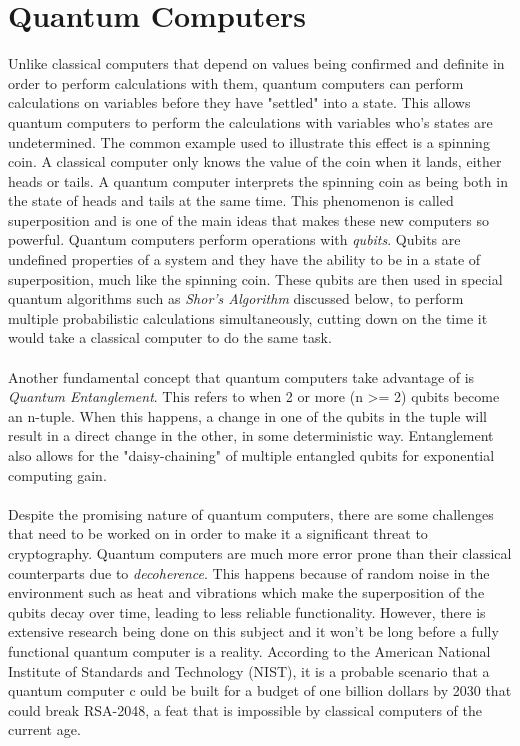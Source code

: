 \documentclass[journal]{IEEEtran}
\begin{document}
\section{Quantum Computers}
Unlike classical computers that depend on values being confirmed and definite in order to perform calculations with them, quantum computers can perform calculations 
on variables before they have "settled" into  a state. This allows quantum computers to perform the calculations with variables who’s states are undetermined. 
The common example used to illustrate this effect is a spinning coin. A classical computer only knows the value of the coin when it lands, either heads or tails. 
A quantum computer interprets the spinning coin as being both in the state of heads and tails at the same time. 
This phenomenon is called superposition and is one of the main ideas that makes these new computers so powerful. Quantum computers perform operations with \emph{qubits}. 
Qubits are undefined properties of a system and they have the ability to be in a state of superposition, much like the spinning coin. These qubits are then used in special quantum algorithms such as 
\emph{Shor's Algorithm} discussed below, to perform multiple probabilistic calculations simultaneously, cutting down on the time it would take a classical computer to do the same task. \\ \\ 
Another fundamental concept that quantum computers take advantage of is \emph{Quantum Entanglement}. This refers to when 2 or more (n >= 2) qubits become an n-tuple. When this happens, 
a change in one of the qubits in the tuple will result in a direct change in the other, in some deterministic way. Entanglement also allows for the "daisy-chaining" of multiple entangled qubits 
for exponential computing gain. \\ \\ 
Despite the promising nature of quantum computers, there are some challenges that need to be worked on in order to make it a significant threat to cryptography. 
Quantum computers are much more error prone than their classical counterparts due to \emph{decoherence}. This happens because of random noise in the environment such as 
heat and vibrations which make the superposition of the qubits decay over time, leading to less reliable functionality. 
However, there is extensive research being done on this subject and it won't be long before a fully functional quantum computer is a reality. 
According to the American National Institute of Standards and Technology (NIST), it is a probable scenario that a quantum computer c
ould be built for a budget of one billion dollars by 2030 that could break RSA-2048, a feat that is impossible by classical computers of the current age. 
\end{document}
